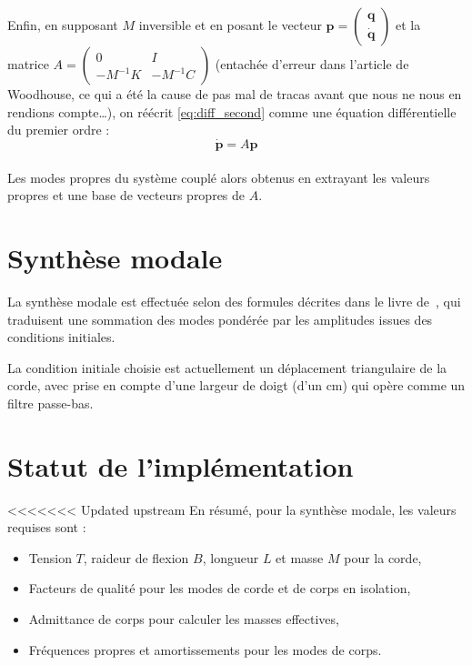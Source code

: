   Enfin, en supposant \( M \) inversible et en posant le vecteur
\( \bm{p} = \begin{pmatrix} \bm{q} \\ \bm{\dot{q}} \end{pmatrix} \) et la
matrice \( A = \begin{pmatrix} 0 & I \\ -M^{-1}K & -M^{-1}C \end{pmatrix} \)
(entachée d'erreur dans l'article de Woodhouse, ce qui a été la cause de pas
mal de tracas avant que nous ne nous en rendions compte\dots), on réécrit
\ref{eq:diff_second} comme une équation différentielle du premier ordre :
\[ \bm{\dot{p}} = A\bm{p} \]

\paragraph{}
  Les modes propres du système couplé alors obtenus en extrayant les valeurs
propres et une base de vecteurs propres de \( A \).

\section{Synthèse modale}

  La synthèse modale est effectuée selon des formules décrites
dans le livre de~\textcite{newland}, qui traduisent une sommation des modes
pondérée par les amplitudes issues des conditions initiales.

  La condition initiale choisie est actuellement un déplacement triangulaire
de la corde, avec prise en compte d'une largeur de doigt (d'un \( \si{\cm} \))
qui opère comme un filtre passe-bas.

\section{Statut de l'implémentation}

<<<<<<< Updated upstream
En résumé, pour la synthèse modale, les valeurs requises sont :
\begin{itemize}
 \item Tension \( T \), raideur de flexion \( B \), longueur \( L \) et
  masse \( M \) pour la corde,
 \item Facteurs de qualité pour les modes de corde et de corps en isolation,
 \item Admittance de corps pour calculer les masses effectives,
 \item Fréquences propres et amortissements pour les modes de corps.
\end{itemize}


